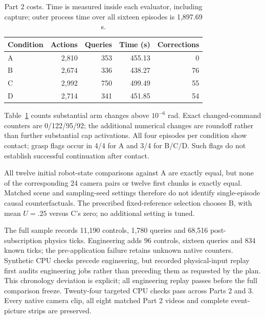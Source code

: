 \begin{table}[t]
\caption{Part 2 costs. Time is measured inside each evaluator, including capture;
outer process time over all sixteen episodes is 1,897.69 s.}
\label{tab:part2-costs}
\begin{tabular}{lrrrr}
\toprule
Condition & Actions & Queries & Time (s) & Corrections \\
\midrule
A & 2,810 & 353 & 455.13 & 0 \\
B & 2,674 & 336 & 438.27 & 76 \\
C & 2,992 & 750 & 499.49 & 55 \\
D & 2,714 & 341 & 451.85 & 54 \\
\bottomrule
\end{tabular}
\end{table}

Table~\ref{tab:part2-costs} counts substantial arm changes above $10^{-6}$ rad.
Exact changed-command counters are 0/122/95/92; the additional numerical changes
are roundoff rather than further substantial cap activations. All four episodes per
condition show contact; grasp flags occur in 4/4 for A and 3/4 for B/C/D. Such flags
do not establish successful continuation after contact.

All twelve initial robot-state comparisons against A are exactly equal, but none of
the corresponding 24 camera pairs or twelve first chunks is exactly equal. Matched
scene and sampling-seed settings therefore do not identify single-episode causal
counterfactuals. The prescribed fixed-reference selection chooses B, with mean
$U=.25$ versus C's zero; no additional setting is tuned.

The full sample records 11,190 controls, 1,780 queries and 68,516 post-subscription
physics ticks. Engineering adds 96 controls, sixteen queries and 834 known ticks;
the pre-application failure retains unknown native counters. Synthetic CPU checks
precede engineering, but recorded physical-input replay first audits engineering
jobs rather than preceding them as requested by the plan. This chronology deviation
is explicit; all engineering replay passes before the full comparison freeze.
Twenty-four targeted CPU checks pass across Parts 2 and 3. Every native camera clip,
all eight matched Part 2 videos and complete event-picture strips are preserved.
